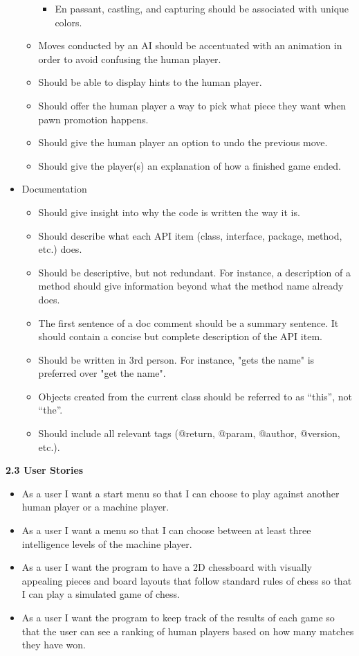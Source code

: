 \documentclass{article}
\begin{document}
\begin{flushleft}
\begin{itemize}
\begin{itemize}
		\begin{itemize}
			\item En passant, castling, and capturing should be associated with unique colors.
		\end{itemize}
		\item Moves conducted by an AI should be accentuated with an animation in order to avoid confusing the human player.
		\item Should be able to display hints to the human player.
		\item Should offer the human player a way to pick what piece they want when pawn promotion happens.
		\item Should give the human player an option to undo the previous move.
		\item Should give the player(s) an explanation of how a finished game ended.
	\end{itemize}
	\item Documentation
	\begin{itemize}
		\item Should give insight into why the code is written the way it is.
		\item Should describe what each API item (class, interface, package, method, etc.) does.
		\item Should be descriptive, but not redundant. For instance, a description of a method should give information beyond what the method name already does.
		\item The first sentence of a doc comment should be a summary sentence. It should contain a concise but complete description of the API item.
		\item Should be written in 3rd person. For instance, "gets the name" is preferred over "get the name".
		\item Objects created from the current class should be referred to as “this”, not “the”.
		\item Should include all relevant tags (@return, @param, @author, @version, etc.).
	\end{itemize}
\end{itemize}

\vspace{5mm}
\textbf{2.3	User Stories}\\
	\begin{itemize}
	
	\item As a user I want a start menu so that I can choose to play against another human player or a machine player.
	\item As a user I want a menu so that I can choose between at least three intelligence levels of the machine player.
	\item As a user I want the program to have a 2D chessboard with visually appealing pieces and board layouts that follow standard rules of chess so that I can play a simulated game of chess.
	\item As a user I want the program to keep track of the results of each game so that the user can see a ranking of human players based on how many matches they have won.


\end{itemize}
\end{flushleft}
\end{document}
